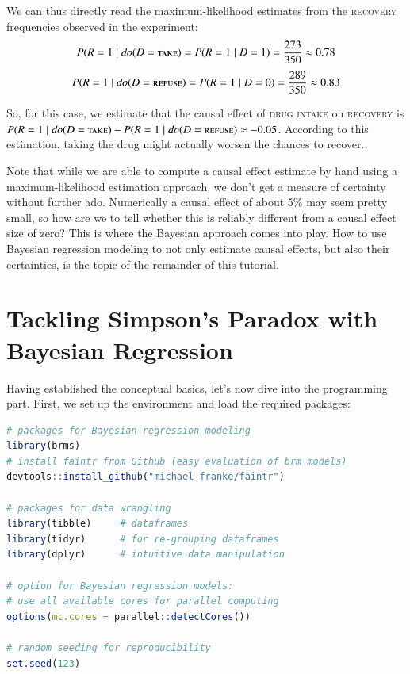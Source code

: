 \documentclass[nobib]{tufte-handout}
\newcommand{\mathdo}{\mathit{do}}
\begin{document}
We can thus directly read the maximum-likelihood estimates from the \textsc{recovery} frequencies observed in the experiment:
\begin{equation}
\begin{split}
P(R=1\mid \mathdo(D=\textsc{take})
= P(R=1\mid D=1)
= \frac{273}{350} \approx 0.78
\end{split}
\end{equation}
\begin{equation}
\begin{split}
P(R=1\mid \mathdo(D=\textsc{refuse})
= P(R=1\mid D=0)
= \frac{289}{350} \approx 0.83
\end{split}
\end{equation}

So, for this case, we estimate that the causal effect of \textsc{drug intake} on \textsc{recovery} is $P(R=1\mid \mathdo(D=\textsc{take})-P(R=1\mid \mathdo(D=\textsc{refuse}) \approx -0.05$.
According to this estimation, taking the drug might actually worsen the chances to recover.
\medskip

Note that while we are able to compute a causal effect estimate by hand using a maximum-likelihood estimation approach, we don't get a measure of certainty without further ado. 
Numerically a causal effect of about 5\% may seem pretty small, so how are we to tell whether this is reliably different from a causal effect size of zero?
This is where the Bayesian approach comes into play.
How to use Bayesian regression modeling to not only estimate causal effects, but also their certainties, is the topic of the remainder of this tutorial.

\section{Tackling Simpson's Paradox with Bayesian Regression} \label{sec:programming}

Having established the conceptual basics, let's now dive into the programming part. 
First, we set up the environment and load the required packages:
\begin{minipage}[]{\textwidth}
\begin{lstlisting}[language=R]
# packages for Bayesian regression modeling
library(brms) 
# install faintr from Github (easy evaluation of brm models)
devtools::install_github("michael-franke/faintr")

# packages for data wrangling
library(tibble)     # dataframes 
library(tidyr)      # for re-grouping dataframes
library(dplyr)      # intuitive data manipulation

# option for Bayesian regression models: 
# use all available cores for parallel computing
options(mc.cores = parallel::detectCores())

# random seeding for reproducibility
set.seed(123)
\end{lstlisting}
\end{minipage}
\end{document}
